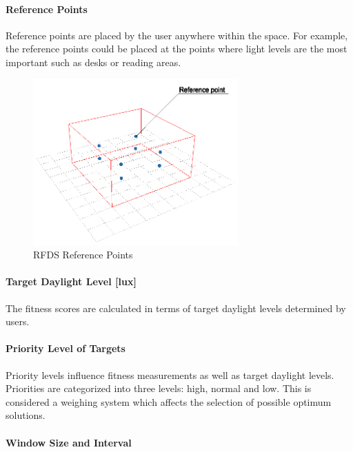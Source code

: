 \paragraph{Reference Points}\mbox{}

Reference points are placed by the user anywhere within the space. For example, the reference points could be placed at the points where light levels are the most important such as desks or reading areas.

\begin{figure}[H]
\centering
\includegraphics[width=0.7\textwidth]{./Images/25-RefPoints}
\caption[RFDS Reference Points]{RFDS Reference Points \cite{kawakita08}}
\label{fig:RFDSRefPoints}
\end{figure}

\paragraph{Target Daylight Level [lux]}\mbox{}

The fitness scores are calculated in terms of target daylight levels determined by users.

\paragraph{Priority Level of Targets}\mbox{}

Priority levels influence fitness measurements as well as target daylight levels. Priorities are categorized into three levels: high, normal and low. This is considered a weighing system which affects the selection of possible optimum solutions.

\paragraph{Window Size and Interval}\mbox{}


